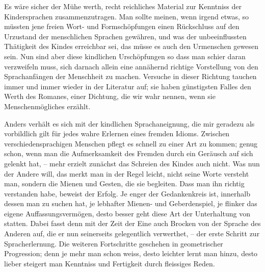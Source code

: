 \label{sp.67}

Es wäre sicher der Mühe werth, recht reichliches Material zur Kenntniss der Kindersprachen zusammenzutragen. Man sollte meinen, wenn irgend etwas, so müssten jene freien Wort- und Formschöpfungen einen Rückschluss auf den Urzustand der menschlichen Sprachen gewähren, und was der unbeeinflussten Thätigkeit des Kindes erreichbar sei, das müsse es auch den Urmenschen gewesen sein. Nun sind aber diese kindlichen Urschöpfungen so  dass man schier daran verzweifeln muss, sich darnach allein eine annähernd richtige Vorstellung von den Sprachanfängen der Menschheit zu machen. Versuche in dieser Richtung tauchen immer und immer wieder in der Literatur auf; sie haben günstigsten Falles den Werth des Romanes, einer Dichtung, die wir wahr nennen, wenn sie Menschenmögliches erzählt.

Anders verhält es sich mit der kindlichen Sprachaneignung, die mir geradezu als vorbildlich gilt für jedes wahre Erlernen eines fremden Idioms. Zwischen verschiedensprachigen Menschen pflegt es schnell zu \label{fp.68} einer Art  zu kommen; genug schon, wenn man die Aufmerksamkeit des Fremden durch ein Geräusch auf sich gelenkt hat, – mehr erzielt zunächst das Schreien des Kindes auch nicht. Was nun der Andere will, das merkt man in der Regel leicht, nicht seine Worte versteht man, sondern die Mienen und Gesten, die sie begleiten. Dass man ihn richtig verstanden habe, beweist der Erfolg. Je enger der Gedankenkreis ist, innerhalb dessen man zu suchen hat, je lebhafter Mienen- und Geberdenspiel, je flinker das eigene Auffassungsvermögen, desto besser geht diese Art der Unterhaltung von statten. Dabei fasst denn mit der Zeit der Eine auch Brocken von der Sprache des Anderen auf, die er nun seinerseits gelegentlich verwerthet, – der erste Schritt zur Spracherlernung. Die weiteren Fortschritte geschehen in geometrischer Progression; denn je mehr man schon weiss, desto leichter lernt man hinzu, desto lieber steigert man Kenntniss und Fertigkeit durch fleissiges Reden.

